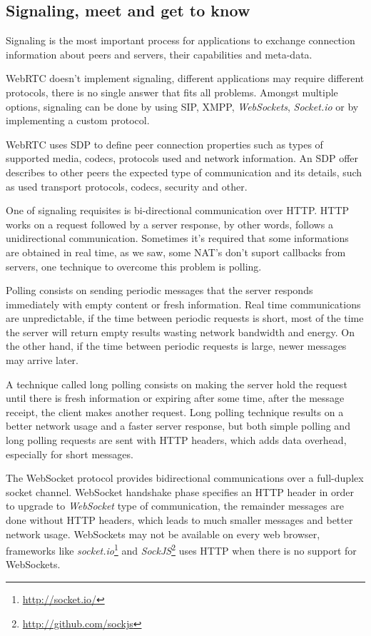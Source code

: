 \subsection{Signaling, meet and get to know}


  Signaling is the most important process for applications to exchange connection information about peers and servers, their capabilities and meta-data.

  \ac{WebRTC} doesn't implement signaling, different applications may require different protocols, there is no single answer that fits all problems. Amongst multiple options, signaling can be done by using \ac{SIP}, \ac{XMPP}, \textit{WebSockets}, \textit{Socket.io} or by implementing a custom protocol.

  \ac{WebRTC} uses \ac{SDP} \cite{rfc4566} to define peer connection properties such as types of supported media, codecs, protocols used and network information. An \ac{SDP} offer describes to other peers the expected type of communication and its details, such as used transport protocols, codecs, security and other.

  One of signaling requisites is bi-directional communication over \ac{HTTP}. \ac{HTTP} works on a request followed by a server response, by other words, follows a unidirectional communication. Sometimes it's required that some informations are obtained in real time, as we saw, some \ac{NAT}'s don't suport callbacks from servers, one technique to overcome this problem is polling.

  Polling consists on sending periodic messages that the server responds immediately with empty content or fresh information. Real time communications are unpredictable, if the time between periodic requests is short, most of the time the server will return empty results wasting network bandwidth and energy. On the other hand, if the time between periodic requests is large, newer messages may arrive later.

  A technique called long polling consists on making the server hold the request until there is fresh information or expiring after some time, after the message receipt, the client makes another request. Long polling technique results on a better network usage and a faster server response, but both simple polling and long polling requests are sent with \ac{HTTP} headers, which adds data overhead, especially for short messages.

  The WebSocket protocol \cite{rfc6455} provides bidirectional communications over a full-duplex socket channel. WebSocket handshake phase specifies an \ac{HTTP} header in order to upgrade to \textit{WebSocket} type of communication, the remainder messages are done without \ac{HTTP} headers, which leads to much smaller messages and better network usage. WebSockets may not be available on every web browser, frameworks like \textit{socket.io}\footnote{\url{http://socket.io/}} and \textit{SockJS}\footnote{\url{http://github.com/sockjs}} uses \ac{HTTP} when there is no support for WebSockets. 

